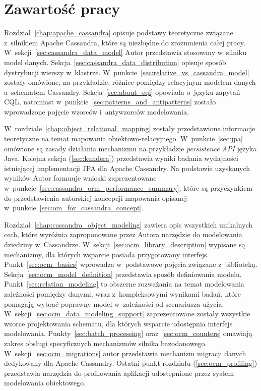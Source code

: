 \section{Zawartość pracy}

Rozdział~\ref{chap:apache_cassandra} opisuje podstawy teoretyczne związane z~silnikiem Apache Cassandra, które są niezbędne do zrozumienia całej pracy. W~sekcji~\ref{sec:cassandra_data_model} Autor przedstawia stosowany w~silniku model danych. Sekcja~\ref{sec:cassandra_data_distribution} opisuje sposób dystrybucji wierszy w~klastrze. W~punkcie~\ref{sec:relative_vs_cassandra_model} zostały omówione, na przykładzie, różnice pomiędzy relacyjnym modelem danych a~schematem Cassandry. Sekcja~\ref{sec:about_cql} opowiada o~języku zapytań CQL, natomiast w~punkcie~\ref{sec:patterns_and_antipatterns} zostało wprowadzone pojęcie wzorców i~antywzorców modelowania.

W~rozdziale~\ref{chap:object_relational_mapping} zostały przedstawione informacje teoretyczne na temat mapowania obiektowo-relacyjnego. W~punkcie~\ref{sec:jpa} omówione są zasady działania mechanizmu na przykładzie \emph{persistence API} języka Java. Kolejna sekcja (\ref{sec:kundera}) przedstawia wyniki badania wydajności istniejącej implementacji JPA dla Apache Cassandry. Na podstawie uzyskanych wyników Autor formuuje wnioski zaprezentowane w~punkcie~\ref{sec:cassandra_orm_performance_summary}, które są przyczynkiem do przedstawienia autorskiej koncepcji mapowania opisanej w~punkcie~\ref{sec:om_for_cassandra_concept}.

Rozdział~\ref{chap:cassandra_object_modeling} zawiera opis wszystkich unikalnych cech, które wyróżnia zaproponowane przez Autora narzędzie do modelowania dziedziny w~Cassandrze. W~sekcji~\ref{sec:ocm_library_description} wypisane są mechanizmy, dla których wsparcie posiada przygotowany interfejs. Punkt~\ref{sec:ocm_basics} wprowadza w~podstawowe pojęcia związane z~biblioteką. Sekcja~\ref{sec:ocm_model_definition} przedstawia sposób definiowania modelu. Punkt~\ref{sec:relation_modeling} to obszerne rozważania na temat modelowania zależności pomiędzy danymi, wraz z~kompleksowymi wynikami badań, które pomagają wybrać poprawny model w~zależności od scenariusza użycia. W~sekcji~\ref{sec:ocm_data_modeling_support} zaprezentowane zostały wszystkie wzorce projektowania schematu, dla których wsparcie udostępnia interfejs modelowania. Punkty~\ref{sec:batch_processing} oraz~\ref{sec:ocm_counters} omawiają zakres obsługi specyficznych mechanizmów silnika bazodanowego. W~sekcji~\ref{sec:ocm_migrations} autor przedstawia mechanizm migracji danych dedykowany dla Apache Cassandry. Ostatni punkt rozdziału (\ref{sec:ocm_profiling}) przedstawia narzędzia do profilowania aplikacji udostępnione przez system modelowania obiektowego.